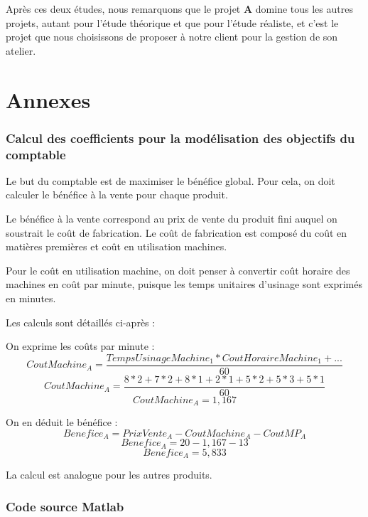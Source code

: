\documentclass[a4paper,10pt]{article}
\begin{document}
Après ces deux études, nous remarquons que le projet \textbf{A} domine tous les autres projets, autant pour l'étude théorique et que pour l'étude réaliste, et c'est le projet que nous choisissons de proposer à notre client pour la gestion de son atelier.



\newpage
\part{Annexes}
\appendix

\section{Calcul des coefficients pour la modélisation des objectifs du comptable}
\label{annexe}

Le but du comptable est de maximiser le bénéfice global. Pour cela, on doit
calculer le bénéfice à la vente pour chaque produit.

Le bénéfice à la vente correspond au prix de vente du produit fini auquel
on soustrait le coût de fabrication. Le coût de fabrication est composé du
coût en matières premières et coût en utilisation machines.

Pour le coût en utilisation machine, on doit penser à convertir coût horaire
des machines en coût par minute, puisque les temps unitaires d'usinage sont
exprimés en minutes.

Les calculs sont détaillés ci-après :

On exprime les coûts par minute :
$$ CoutMachine_A = \frac{TempsUsinageMachine_1*CoutHoraireMachine_1 + ...}{60} $$
$$ CoutMachine_A = \frac{8*2+7*2+8*1+2*1+5*2+5*3+5*1}{60} $$
$$ CoutMachine_A = 1,167 $$

On en déduit le bénéfice :
$$ Benefice_A = PrixVente_A - CoutMachine_A - CoutMP_A $$
$$ Benefice_A = 20 - 1,167 - 13 $$
$$ Benefice_A = 5,833 $$

La calcul est analogue pour les autres produits.


\newpage
\section{Code source Matlab}

\newpage

\end{document}
